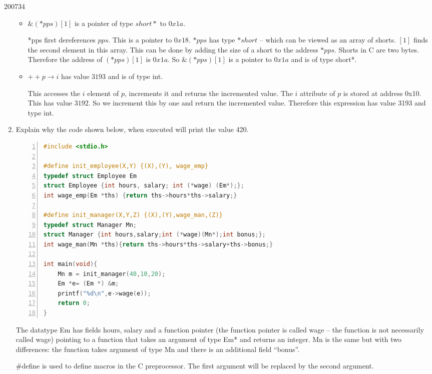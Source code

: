 \documentclass[10pt,\jkfside,a4paper]{article}
\begin{document}
\begin{examquestion}{2007}{3}{4}
\begin{enumerate}[label=(\alph*)]
\begin{itemize}
\item $\&(*pps)[1]$ is a pointer of type $short *$ to $0x1a$.

*pps first dereferences $pps$. This is a pointer to $0x18$. $*pps$ has type
$*short$ -- which can be viewed as an array of shorts. $[1]$ finds the
second element in this array. This can be done by adding the size of a short
to the address $*pps$. Shorts in C are two bytes. Therefore the address of
$(*pps)[1]$ is $0x1a$. So $\&(*pps)[1]$ is a pointer to $0x1a$ and is of
type short*.

\item $++p\rightarrow i$ has value $3193$ and is of type int.

This accesses the $i$ element of $p$, increments it and returns the
incremented value. The $i$ attribute of $p$ is stored at address 0x10. This
has value $3192$. So we increment this by one and return the incremented value.
Therefore this expression has value 3193 and type int.

\end{itemize}

\item Explain why the code shown below, when executed will print the value 420.

\begin{lstlisting}[language=C, numbers=left]
#include <stdio.h>

#define init_employee(X,Y) {(X),(Y), wage_emp}
typedef struct Employee Em
struct Employee {int hours, salary; int (*wage) (Em*);};
int wage_emp(Em *ths) {return ths->hours*ths->salary;}

#define init_manager(X,Y,Z) {(X),(Y),wage_man,(Z)}
typedef struct Manager Mn;
struct Manager {int hours,salary;int (*wage)(Mn*);int bonus;};
int wage_man(Mn *ths){return ths->hours*ths->salary+ths->bonus;}

int main(void){
	Mn m = init_manager(40,10,20);
	Em *e= (Em *) &m;
	printf("%d\n",e->wage(e));
	return 0;
}
\end{lstlisting}

The datatype Em has fields hours, salary and a function pointer
(the function pointer is called wage -- the function is not necessarily
called wage) pointing to a function that takes an argument of type Em* and
returns an integer. Mn is the same but with two differences: the
function takes argument of type Mn and there is an additional
field ``bonus''.

\#define is used to define macros in the C preprocessor.
The first argument will be replaced by the second argument.


\end{enumerate}
\end{examquestion}
\end{document}
